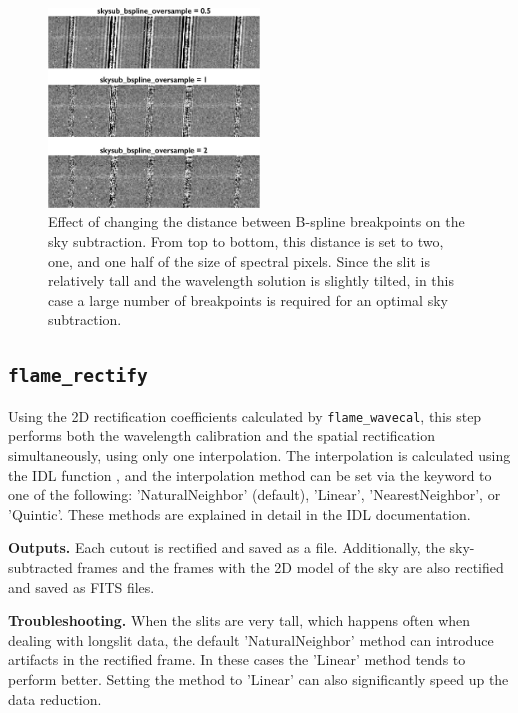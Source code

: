 \documentclass[a4paper]{article}
\begin{document}
\begin{sloppypar}
\begin{figure}[tbp]
\centering
\includegraphics[width=0.5\textwidth]{oversample}
\caption{Effect of changing the distance between B-spline breakpoints on the sky subtraction. From top to bottom, this distance is set to two, one, and one half of the size of spectral pixels. Since the slit is relatively tall and the wavelength solution is slightly tilted, in this case a large number of breakpoints is required for an optimal sky subtraction.}
\label{fig:bspline}
\end{figure}


\subsection{\texttt{flame\_rectify}}
\label{sec:rectify}

Using the 2D rectification coefficients calculated by \texttt{flame\_wavecal}, this step performs both the wavelength calibration and the spatial rectification simultaneously, using only one interpolation. The interpolation is calculated using the IDL function , and the interpolation method can be set via the  keyword to one of the following: 'NaturalNeighbor' (default), 'Linear', 'NearestNeighbor', or 'Quintic'. These methods are explained in detail in the IDL documentation.

\medskip
\noindent
\textbf{Outputs.} Each cutout is rectified and saved as a  file. Additionally, the sky-subtracted frames and the frames with the 2D model of the sky are also rectified and saved as FITS files.

\medskip
\noindent
\textbf{Troubleshooting.} When the slits are very tall, which happens often when dealing with longslit data, the default 'NaturalNeighbor' method can introduce artifacts in the rectified frame. In these cases the 'Linear' method tends to perform better. Setting the method to 'Linear' can also significantly speed up the data reduction.




\end{sloppypar}
\end{document}
